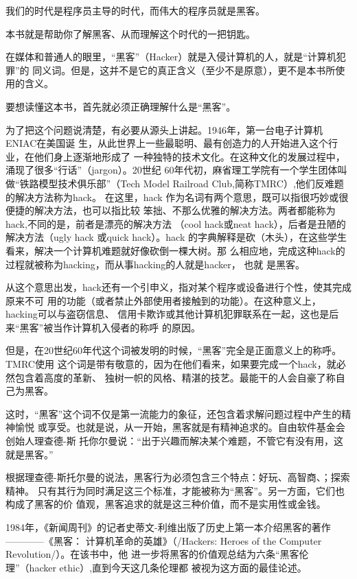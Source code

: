 \documentclass[11pt]{ctexart}
\begin{document}
{{{{我们的时代是程序员主导的时代，而伟大的程序员就是黑客。

本书就是帮助你了解黑客、从而理解这个时代的一把钥匙。

在媒体和普通人的眼里，“黑客”（Hacker）就是入侵计算机的人，就是“计算机犯罪”的
同义词。但是，这并不是它的真正含义（至少不是原意），更不是本书所使用的含义。

要想读懂这本书，首先就必须正确理解什么是“黑客”。

为了把这个问题说清楚，有必要从源头上讲起。1946年，第一台电子计算机ENIAC在美国诞
生，从此世界上一些最聪明、最有创造力的人开始进入这个行业，在他们身上逐渐地形成了
一种独特的技术文化。在这种文化的发展过程中，涌现了很多“行话”（jargon）。20世纪
60年代初，麻省理工学院有一个学生团体叫做“铁路模型技术俱乐部”（Tech Model
Railroad Club,简称TMRC）,他们反难题的解决方法称为hack。
在这里，hack 作为名词有两个意思，既可以指很巧妙或很便捷的解决方法，也可以指比较
笨拙、不那么优雅的解决方法。两者都能称为hack,不同的是，前者是漂亮的解决方法
（cool hack或neat hack），后者是丑陋的解决方法（ugly hack 或quick hack）。hack
的字典解释是砍（木头），在这些学生看来，解决一个计算机难题就好像砍倒一棵大树。那
么相应地，完成这种hack的过程就被称为hacking，而从事hacking的人就是hacker， 也就
是黑客。

从这个意思出发，hack还有一个引申义，指对某个程序或设备进行个性，使其完成原来不可
用的功能（或者禁止外部使用者接触到的功能）。在这种意义上，hacking可以与盗窃信息、
信用卡欺诈或其他计算机犯罪联系在一起，这也是后来“黑客”被当作计算机入侵者的称呼
的原因。

但是，在20世纪60年代这个词被发明的时候，“黑客”完全是正面意义上的称呼。TMRC使用
这个词是带有敬意的，因为在他们看来，如果要完成一个hack，就必然包含着高度的革新、
独树一帜的风格、精湛的技艺。最能干的人会自豪了称自己为黑客。

这时，“黑客”这个词不仅是第一流能力的象征，还包含着求解问题过程中产生的精神愉悦
或享受。也就是说，从一开始，黑客就是有精神追求的。自由软件基金会创始人理查德-斯
托你尔曼说：“出于兴趣而解决某个难题，不管它有没有用，这就是黑客。”

根据理查德-斯托尔曼的说法，黑客行为必须包含三个特点：好玩、高智商、；探索精神。
只有其行为同时满足这三个标准，才能被称为“黑客”。另一方面，它们也构成了黑客的价
值观，黑客追求的就是这三种价值，而不是实用性或金钱。

1984年，《新闻周刊》的记者史蒂文-利维出版了历史上第一本介绍黑客的著作————《黑客：
计算机革命的英雄》（/Hackers: Heroes of the Computer Revolution/）。在该书中，他
进一步将黑客的价值观总结为六条“黑客伦理”（hacker ethic）,直到今天这几条伦理都
被视为这方面的最佳论述。

}}}}
\end{document}
